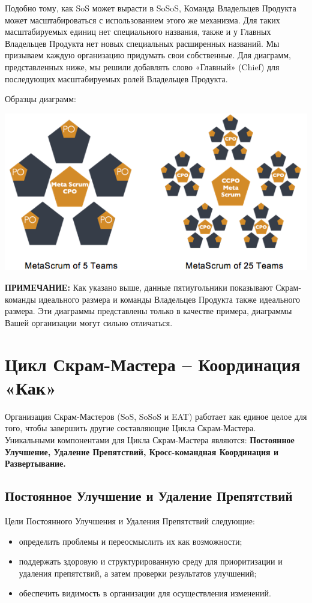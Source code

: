 \documentclass[12pt,a4paper,parskip=full]{scrartcl}
\begin{document}
Подобно тому, как SoS может вырасти в SoSoS, Команда Владельцев Продукта может масштабироваться с использованием этого же механизма. Для таких масштабируемых единиц нет специального названия, также и у Главных Владельцев Продукта нет новых специальных расширенных названий. Мы призываем каждую организацию придумать свои собственные. Для диаграмм, представленных ниже, мы решили добавлять слово «Главный» (Chief) для последующих масштабируемых ролей Владельцев Продукта.

Образцы диаграмм:

\includegraphics[width=1.0\linewidth]{MetaScrum-R2.png}

\textbf{ПРИМЕЧАНИЕ:} Как указано выше, данные пятиугольники показывают Скрам-команды идеального размера и команды Владельцев Продукта также идеального размера. Эти диаграммы представлены только в качестве примера, диаграммы Вашей организации могут сильно отличаться. 

\section{Цикл Скрам-Мастера – Координация «Как»}

Организация Скрам-Мастеров (SoS, SoSoS и EAT) работает как единое целое для того, чтобы завершить другие составляющие Цикла Скрам-Мастера. Уникальными компонентами для Цикла Скрам-Мастера являются: \textbf{ Постоянное Улучшение, Удаление Препятствий, Кросс-командная Координация и Развертывание.}

\subsection{Постоянное Улучшение и Удаление Препятствий}

Цели Постоянного Улучшения и Удаления Препятствий следующие:

\begin{itemize}
	\item определить проблемы и переосмыслить их как возможности; 
	\item поддержать здоровую и структурированную среду для приоритизации и удаления препятствий, а затем проверки результатов улучшений; 
	\item обеспечить видимость в организации для осуществления изменений.
\end{itemize}
\end{document}
